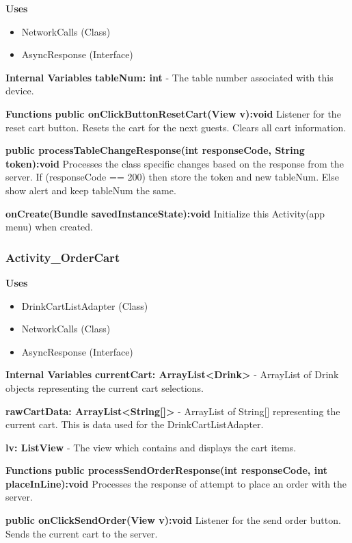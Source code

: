 \documentclass [10pt]{article}
\begin{document}
\textbf{Uses}
\begin{itemize}
	\item NetworkCalls (Class)
	\item AsyncResponse (Interface)
\end{itemize}

\textbf{Internal Variables}
\textbf{tableNum: int} - The table number associated with this device.

\textbf{Functions}
\textbf{public onClickButtonResetCart(View v):void}
Listener for the reset cart button. Resets the cart for the next guests. Clears all cart information.

\textbf{public processTableChangeResponse(int responseCode, String token):void}
Processes the class specific changes based on the response from the server. If (responseCode == 200) then store the token and new tableNum. Else show alert and keep tableNum the same.

\textbf{onCreate(Bundle savedInstanceState):void}
Initialize this Activity(app menu) when created.

\subsubsection{Activity\_OrderCart}

\textbf{Uses}

\begin{itemize}
	\item DrinkCartListAdapter (Class)
	\item NetworkCalls (Class)
	\item AsyncResponse (Interface)
\end{itemize}

\textbf{Internal Variables}
\textbf{currentCart: ArrayList<Drink>} - ArrayList of Drink objects representing the current cart selections.

\textbf{rawCartData: ArrayList<String[]>} - ArrayList of String[] representing the current cart. This is data used for the DrinkCartListAdapter.

\textbf{lv: ListView} - The view which contains and displays the cart items.

\textbf{Functions}
\textbf{public processSendOrderResponse(int responseCode, int placeInLine):void}
Processes the response of attempt to place an order with the server.

\textbf{public onClickSendOrder(View v):void}
Listener for the send order button. Sends the current cart to the server.
\end{document}
